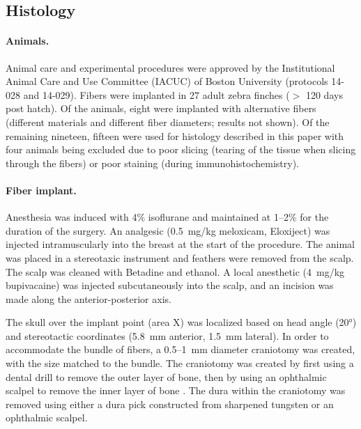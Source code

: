 \subsection{Histology}

\paragraph{Animals.} Animal care and experimental procedures were 
approved by the Institutional Animal Care and Use Committee (IACUC) 
of Boston University (protocols 14-028 and 14-029). Fibers were 
implanted in 27 adult zebra finches ($>$ 120 days post hatch). Of 
the animals, eight were implanted with alternative fibers 
(different materials and different fiber diameters; results not 
shown). Of the remaining nineteen, fifteen were used for histology 
described in this paper with four animals being excluded due to 
poor slicing (tearing of the tissue when slicing through the 
fibers) or poor staining (during immunohistochemistry).

\paragraph{Fiber implant.} Anesthesia was induced with 4\% isoflurane 
and maintained at 1--2\% for the duration of the surgery. An analgesic 
(0.5~mg/kg meloxicam, Eloxiject) was injected intramuscularly into the 
breast at the start of the procedure. The animal was placed in a 
stereotaxic instrument and feathers were removed from the scalp. The 
scalp was cleaned with Betadine and ethanol. A local anesthetic 
(4~mg/kg bupivacaine) was injected subcutaneously into the scalp, and 
an incision was made along the anterior-posterior axis.

The skull over the implant point (area X) was localized based on head 
angle (\ang{20}) and stereotactic coordinates (5.8~mm anterior, 1.5~mm 
lateral). In order to accommodate the bundle of fibers, a 0.5--1~mm 
diameter craniotomy was created, with the size matched to the bundle. 
The craniotomy was created by first using a dental drill to remove the 
outer layer of bone, then by using an ophthalmic scalpel to remove the 
inner layer of bone \cite{Long:2010db}. The dura within the craniotomy 
was removed using either a dura pick constructed from sharpened 
tungsten or an ophthalmic scalpel.

